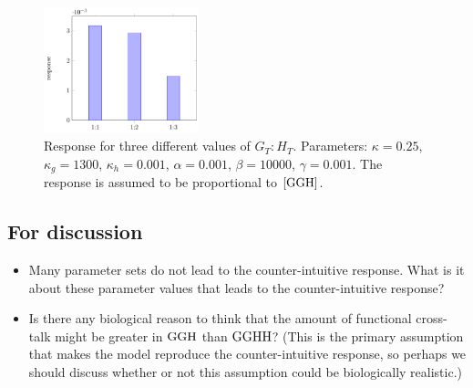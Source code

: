 \documentclass[12pt]{article}
\def\GGH{{\rm GGH}}
\def\GGHH{{\rm GGHH}}
\def\ggh{[\GGH]}
\def\gtot{G_T}
\def\htot{H_T}
\begin{document}
 \begin{figure}
    \centering
     \includegraphics[width=0.4\textwidth]{FigGHRatioStudyBarGraph.pdf}    \caption{Response for three different values of $\gtot:\htot$. Parameters: $\kappa=0.25$, $\kappa_g=1300$, $\kappa_h=0.001$, $\alpha=0.001$, $\beta=10000$, $\gamma=0.001$.  The response is assumed to be proportional to $\ggh$.}
    \label{FigBars}
\end{figure}

\subsection*{For discussion}

\begin{itemize}
\item Many parameter sets do not lead to the counter-intuitive response.  What is it about these parameter values that leads to the counter-intuitive response?  

\item Is there any biological reason to think that the amount of functional cross-talk might be greater in $\GGH$ than $\GGHH$?  (This is the primary assumption that makes the model reproduce the counter-intuitive response, so perhaps we should discuss whether or not this assumption could be biologically realistic.) 

 \end{itemize}

\nocite{MorenoEtal16}

\end{document}
